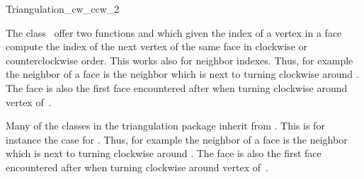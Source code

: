 

\begin{ccRefClass}{Triangulation_cw_ccw_2}  %


\ccDefinition
  
The class \ccRefName\ 
offer  two functions  and 
which given the index of a vertex in a face
compute the index of the next vertex  of the same face
in clockwise
or counterclockwise order.
This works also for neighbor indexes.
 Thus, for example the neighbor 
 of a face  is
 the
neighbor  which is next to  turning clockwise
around \ccc{f}. The face 
is also the first face encountered after  when
turning clockwise around vertex 
of~\ccc{f}.

Many of the classes in the triangulation package
inherit from \ccRefName. This is for instance the case for
.
 Thus, for example the neighbor 
 of a face  is
 the
neighbor  which is next to  turning clockwise
around \ccc{f}. The face 
is also the first face encountered after  when
turning clockwise around vertex 
of~\ccc{f}.




\end{ccRefClass}
